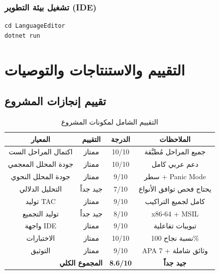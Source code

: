 \documentclass[12pt,a4paper]{report}
\begin{document}
\subsection{تشغيل بيئة التطوير (IDE)}
\begin{CodeBox}[]
\begin{lstlisting}[basicstyle=\ttfamily\small]
cd LanguageEditor
dotnet run
\end{lstlisting}
\end{CodeBox}

\chapter{التقييم والاستنتاجات والتوصيات}

\section{تقييم إنجازات المشروع}

\begin{table}[H]
\caption{\arabicfont التقييم الشامل لمكونات المشروع}
\label{tab:evaluation}
\centering
\begin{tabular}{|c|c|c|c|}
\hline
\rowcolor{TableHead}
\textbf{\arabicfont المعيار} & \textbf{\arabicfont التقييم} & \textbf{\arabicfont الدرجة} & \textbf{\arabicfont الملاحظات} \\
\hline
\arabicfont اكتمال المراحل الست & \arabicfont ممتاز & 10/10 & \arabicfont جميع المراحل مُطبَّقة \\
\hline
\rowcolor{TableAlt}
\arabicfont جودة المحلل المعجمي & \arabicfont ممتاز & 10/10 & \arabicfont دعم عربي كامل \\
\hline
\arabicfont جودة المحلل النحوي & \arabicfont ممتاز & 9/10 & \arabicfont 773 سطر + Panic Mode \\
\hline
\rowcolor{TableAlt}
\arabicfont التحليل الدلالي & \arabicfont جيد جداً & 7/10 & \arabicfont يحتاج فحص توافق الأنواع \\
\hline
\arabicfont توليد TAC & \arabicfont ممتاز & 9/10 & \arabicfont كامل لجميع التراكيب \\
\hline
\rowcolor{TableAlt}
\arabicfont توليد التجميع & \arabicfont جيد جداً & 8/10 & \arabicfont x86-64 + MSIL \\
\hline
\arabicfont واجهة IDE & \arabicfont ممتاز & 9/10 & \arabicfont 8 تبويبات تفاعلية \\
\hline
\rowcolor{TableAlt}
\arabicfont الاختبارات & \arabicfont ممتاز & 10/10 & \arabicfont نسبة نجاح 100\% \\
\hline
\arabicfont التوثيق & \arabicfont ممتاز & 9/10 & \arabicfont APA 7 + وثائق شاملة \\
\hline
\multicolumn{2}{|r|}{\textbf{\arabicfont المجموع الكلي}} & \textbf{8.6/10} & \textcolor{SuccessGreen}{\textbf{\arabicfont جيد جداً}} \\
\hline
\end{tabular}
\end{table}
\end{document}
